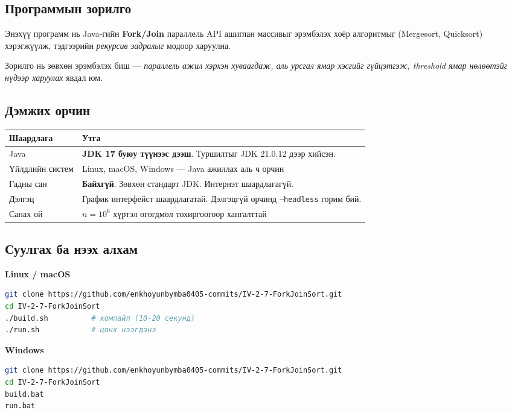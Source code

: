 \documentclass[11pt,a4paper]{article}
\begin{document}
\subsection{Программын зорилго}
Энэхүү программ нь Java-гийн \textbf{Fork/Join} параллель API ашиглан массивыг
эрэмбэлэх хоёр алгоритмыг (Mergesort, Quicksort) хэрэгжүүлж, тэдгээрийн
\emph{рекурсив задралыг} модоор харуулна.

Зорилго нь зөвхөн эрэмбэлэх биш --- \emph{параллель ажил хэрхэн хуваагдаж,
аль урсгал ямар хэсгийг гүйцэтгэж, threshold ямар нөлөөтэйг нүдээр харуулах}
явдал юм.

\subsection{Дэмжих орчин}
\begin{center}
\small
\begin{tabular}{lL{10.5cm}}
\toprule
Шаардлага & Утга \\
\midrule
Java & \textbf{JDK 17 буюу түүнээс дээш}. Туршилтыг JDK 21.0.12 дээр хийсэн. \\
Үйлдлийн систем & Linux, macOS, Windows --- Java ажиллах аль ч орчин \\
Гадны сан & \textbf{Байхгүй}. Зөвхөн стандарт JDK. Интернэт шаардлагагүй. \\
Дэлгэц & График интерфейст шаардлагатай. Дэлгэцгүй орчинд \texttt{--headless}
горим бий. \\
Санах ой & $n = 10^6$ хүртэл өгөгдмөл тохиргоогоор хангалттай \\
\bottomrule
\end{tabular}
\end{center}

\subsection{Суулгах ба нээх алхам}

\textbf{Linux / macOS}
\begin{lstlisting}[language=bash]
git clone https://github.com/enkhoyunbymba0405-commits/IV-2-7-ForkJoinSort.git
cd IV-2-7-ForkJoinSort
./build.sh          # компайл (10-20 секунд)
./run.sh            # цонх нээгдэнэ
\end{lstlisting}

\textbf{Windows}
\begin{lstlisting}[language=bash]
git clone https://github.com/enkhoyunbymba0405-commits/IV-2-7-ForkJoinSort.git
cd IV-2-7-ForkJoinSort
build.bat
run.bat
\end{lstlisting}
\end{document}
